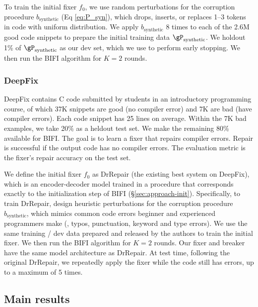 To train the initial fixer $f_0$, we use random perturbations for the corruption procedure $b_\text{synthetic}$ (Eq \ref{eq:P_syn}), which drops, inserts, or replaces 1--3 tokens in code with uniform distribution. We apply $b_\text{synthetic}$ 8 times to each of the 2.6M good code snippets to prepare the initial training data $\gP_\text{synthetic}$. We holdout 1\% of $\gP_\text{synthetic}$ as our dev set, which we use to perform early stopping.
We then run the BIFI algorithm for $K = 2$ rounds.



\subsubsection{DeepFix}
\label{sec:exp-setup-deepfix}
DeepFix \cite{gupta2017deepfix} contains C code submitted by students in an introductory programming course, of which 37K snippets are good (no compiler error) and 7K are bad (have compiler errors). Each code snippet has 25 lines on average.
Within the 7K bad examples, we take 20\% as a heldout test set. We make the remaining 80\% available for BIFI.
The goal is to learn a fixer that repairs compiler errors. Repair is successful if the output code has no compiler errors. The evaluation metric is the fixer's repair accuracy on the test set.


We define the initial fixer $f_0$ as DrRepair \cite{yasunaga2020repair} (the existing best system on DeepFix), which is an encoder-decoder model trained in a procedure that corresponds exactly to the initialization step of BIFI (\S \ref{sec:approach-init}).
Specifically, to train DrRepair, \citet{yasunaga2020repair} design heuristic perturbations for the corruption procedure $b_\text{synthetic}$, which mimics common code errors beginner and experienced programmers make (\eg, typos, punctuation, keyword and type errors).
We use the same training \!/\! dev data prepared and released by the authors to train the initial fixer. 
We then run the BIFI algorithm for $K=2$ rounds. Our fixer and breaker have the same model architecture as DrRepair. 
At test time, following the original DrRepair, we repeatedly apply the fixer while the code still has errors, up to a maximum of 5 times.



\subsection{Main results}

